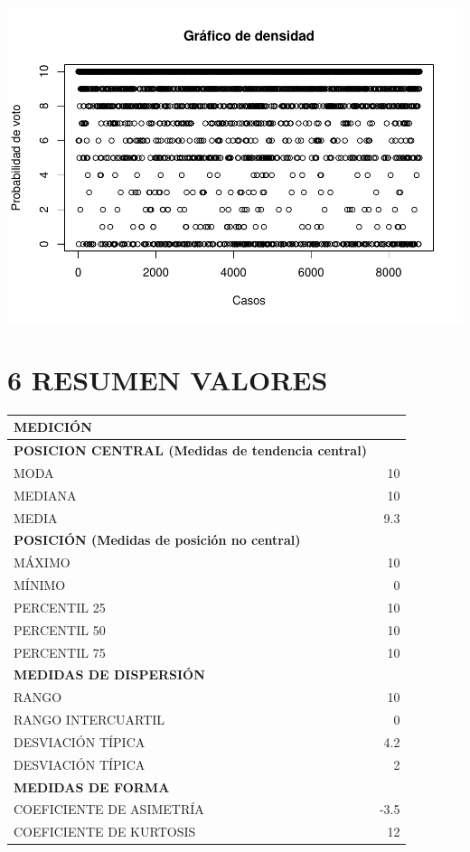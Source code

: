 \documentclass[
]{article}
\newenvironment{Shaded}{\begin{snugshade}}{\end{snugshade}}
\newcommand{\AttributeTok}[1]{\textcolor[rgb]{0.13,0.29,0.53}{#1}}
\newcommand{\FunctionTok}[1]{\textcolor[rgb]{0.13,0.29,0.53}{\textbf{#1}}}
\newcommand{\NormalTok}[1]{#1}
\newcommand{\SpecialCharTok}[1]{\textcolor[rgb]{0.81,0.36,0.00}{\textbf{#1}}}
\newcommand{\StringTok}[1]{\textcolor[rgb]{0.31,0.60,0.02}{#1}}
\begin{document}
\begin{Shaded}
\end{Shaded}

\includegraphics{probabilidadVoto_files/figure-latex/graficoDensidad-1.pdf}

\newpage

\hypertarget{resumen-valores}{%
\section{6 RESUMEN VALORES}\label{resumen-valores}}

\begin{longtable}[]{@{}lr@{}}
\toprule\noalign{}
MEDICIÓN & \\
\midrule\noalign{}
\endhead
\bottomrule\noalign{}
\endlastfoot
\textbf{POSICION CENTRAL (Medidas de tendencia central)} & \\
MODA & 10 \\
MEDIANA & 10 \\
MEDIA & 9.3 \\
\textbf{POSICIÓN (Medidas de posición no central)} & \\
MÁXIMO & 10 \\
MÍNIMO & 0 \\
PERCENTIL 25 & 10 \\
PERCENTIL 50 & 10 \\
PERCENTIL 75 & 10 \\
\textbf{MEDIDAS DE DISPERSIÓN} & \\
RANGO & 10 \\
RANGO INTERCUARTIL & 0 \\
DESVIACIÓN TÍPICA & 4.2 \\
DESVIACIÓN TÍPICA & 2 \\
\textbf{MEDIDAS DE FORMA} & \\
COEFICIENTE DE ASIMETRÍA & -3.5 \\
COEFICIENTE DE KURTOSIS & 12 \\
\end{longtable}
\end{document}
